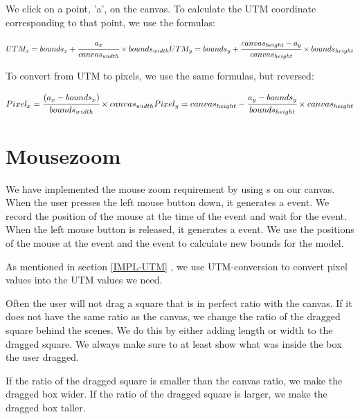 We click on a point, 'a', on the canvas. To calculate the UTM coordinate
corresponding to that point, we use the formulas:

$
UTM_x = bounds_x + \cfrac{a_x}{canvas_{width}} \times bounds_{width}\\
\\
UTM_y = bounds_y + \cfrac{canvas_{height} - a_y}{canvas_{height}} \times bounds_{height}\\
\\
$

To convert from UTM to pixels, we use the same formulas, but reversed:

$
\\
Pixel_x = \cfrac{(a_x - bounds_x)}{bounds_{width}} \times
canvas_{width}\\
\\
Pixel_y = canvas_{height} - \cfrac{a_y - bounds_y}{bounds_{height}} \times
canvas_{height}\\
\\
$

\section{Mousezoom}
\label{IMPL-MZ}
We have implemented the mouse zoom requirement by using s on
our canvas. When the user presses the left mouse button down, it generates a
 event. We record the position of the mouse at the time of
the  event and wait for the  event.
When the left mouse button is released, it generates a 
event. We use the positions of the mouse at the  event and
the  event to calculate new bounds for the model.

As mentioned in section \ref{IMPL-UTM} , we use
UTM-conversion to convert pixel values into the UTM values we need.

Often the user will not drag a square that is in perfect ratio with the
canvas. If it does not have the same ratio as the canvas, we change the ratio
of the dragged square behind the scenes. We do this by either adding length or
width to the dragged square. We always make sure to at least show what was
inside the box the user dragged.

If the ratio of the dragged square is smaller than the canvas ratio, we make the
dragged box wider. If the ratio of the dragged square is larger, we make the
dragged box taller.


